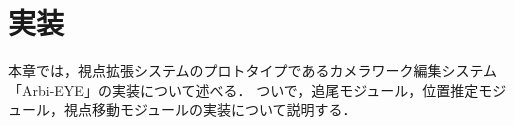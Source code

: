 \chapter{実装}
本章では，視点拡張システムのプロトタイプであるカメラワーク編集システム「Arbi-EYE」の実装について述べる．
ついで，追尾モジュール，位置推定モジュール，視点移動モジュールの実装について説明する．



